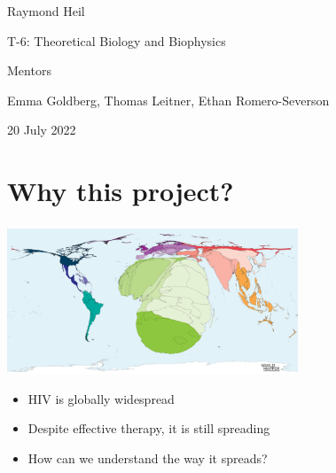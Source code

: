 \documentclass[aspectratio=169]{beamer}
\begin{document}
\begin{frame}

    \begin{center}

        \vfill

        Raymond Heil
        
        T-6: Theoretical Biology and Biophysics

        \vspace{0.5cm}

        Mentors

        Emma Goldberg, Thomas Leitner, Ethan Romero-Severson

        \vfill

        \scriptsize{20 July 2022}

    \end{center}


\end{frame}

\section{Why this project?}

\begin{frame} \frametitle{\insertsection}

    \centering\includegraphics[width=0.65\textwidth]{images/hiv-cartogram}
    
    \begin{itemize}
        \item{HIV is globally widespread}
        \item{Despite effective therapy, it is still spreading}
        \item{How can we understand the way it spreads?}
    \end{itemize}


\end{frame}
\end{document}
